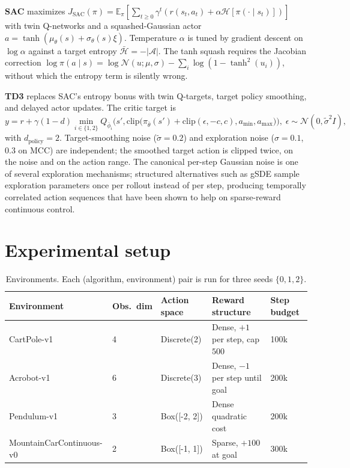 \documentclass[10pt,a4paper]{article}
\begin{document}
\textbf{SAC} \cite{haarnoja2018soft} maximizes $J_{\text{SAC}}(\pi) = \mathbb{E}_{\pi}[\sum_{t \geq 0} \gamma^{t}(r(s_t, a_t) + \alpha \mathcal{H}[\pi(\cdot \mid s_t)])]$ with twin Q-networks and a squashed-Gaussian actor $a = \tanh(\mu_\theta(s) + \sigma_\theta(s) \xi)$. Temperature $\alpha$ is tuned by gradient descent on $\log \alpha$ against a target entropy $\bar{\mathcal{H}} = -|\mathcal{A}|$. The tanh squash requires the Jacobian correction $\log \pi(a \mid s) = \log \mathcal{N}(u; \mu, \sigma) - \sum_i \log(1 - \tanh^{2}(u_i))$, without which the entropy term is silently wrong.

\textbf{TD3} \cite{fujimoto2018addressing} replaces SAC's entropy bonus with twin Q-targets, target policy smoothing, and delayed actor updates. The critic target is
\begin{equation}
y = r + \gamma(1 - d) \min_{i \in \{1, 2\}} Q_{\bar{\phi}_i}\!\Big(s', \mathrm{clip}\!\big(\pi_{\bar{\theta}}(s') + \mathrm{clip}(\epsilon, -c, c), a_{\min}, a_{\max}\big)\Big),\; \epsilon \sim \mathcal{N}(0, \tilde{\sigma}^{2} I),
\label{eq:td3}
\end{equation}
with $d_{\text{policy}} = 2$. Target-smoothing noise ($\tilde{\sigma}=0.2$) and exploration noise ($\sigma=0.1$, $0.3$ on MCC) are independent; the smoothed target action is clipped twice, on the noise and on the action range. The canonical per-step Gaussian noise is one of several exploration mechanisms; structured alternatives such as gSDE \cite{raffin2022smooth} sample exploration parameters once per rollout instead of per step, producing temporally correlated action sequences that have been shown to help on sparse-reward continuous control.


\section{Experimental setup}

\begin{table}[H]
\centering
\small
\begin{tabular}{lllll}
\toprule
Environment & Obs.\ dim & Action space & Reward structure & Step budget \\
\midrule
CartPole-v1               & 4 & Discrete(2)         & Dense, $+1$ per step, cap $500$  & 100k \\
Acrobot-v1                & 6 & Discrete(3)         & Dense, $-1$ per step until goal & 200k \\
Pendulum-v1               & 3 & Box([-2, 2])        & Dense quadratic cost            & 200k \\
MountainCarContinuous-v0  & 2 & Box([-1, 1])        & Sparse, $+100$ at goal           & 300k \\
\bottomrule
\end{tabular}
\caption{Environments. Each (algorithm, environment) pair is run for three seeds $\{0, 1, 2\}$.}
\label{tab:envs}
\end{table}
\end{document}
